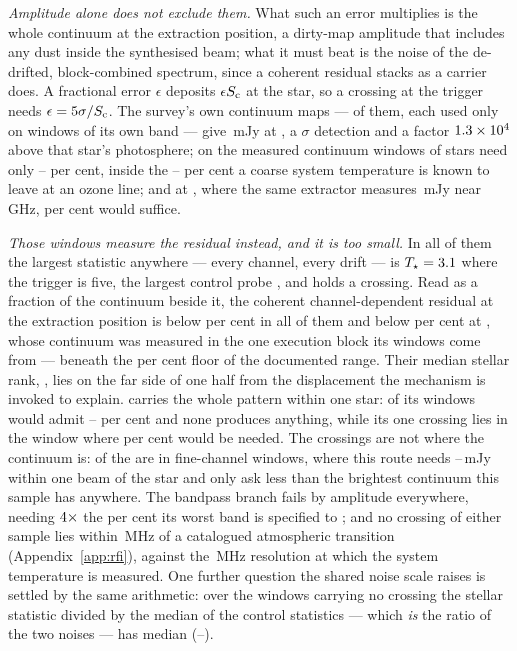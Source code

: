 \emph{Amplitude alone does not exclude them.} What such an error multiplies
is the whole continuum at the extraction position, a dirty-map amplitude that
includes any dust inside the synthesised beam; what it must beat is the noise
of the de-drifted, block-combined spectrum, since a coherent residual stacks
as a carrier does. A fractional error $\epsilon$ deposits $\epsilon S_{\rm c}$
at the star, so a crossing at the trigger needs $\epsilon=5\sigma/S_{\rm c}$.
The survey's own continuum maps --- \CxNMap{} of them, each used only on
windows of its own band --- give \CxContMax\,mJy at \CxContMaxStar, a
\CxContMaxSnr$\sigma$ detection and a factor $1.3\times10^{4}$ above that star's
photosphere; on the measured continuum \CxNAdmit{} windows of
\CxNAdmitStar{} stars need only \CxEpsAdmitLoPct--\CxEpsAdmitHiPct{} per
cent, inside the \CdSpecTsysLo--\CdSpecTsysHi{} per cent a coarse system
temperature is known to leave at an ozone line; and at \CxAuStar, where the
same extractor measures \CxAuContMJy\,mJy near \CxAuGHz\,GHz,
\CxAuEpsPct{} per cent would suffice.

\emph{Those windows measure the residual instead, and it is too small.} In
all \CxNAdmit{} of them the largest statistic anywhere --- every channel,
every drift --- is $T_\star=3.1$ where the trigger is five, the
largest control probe \CxAdmitCtrlHi, and \CxAdmitNCrossWord{} holds a
crossing. Read as
a fraction of the continuum beside it, the coherent channel-dependent
residual at the extraction position is below \CxResidHiPct{} per cent in all
of them and below \CxResidBestPct{} per cent at \CxResidBestStar, whose
continuum was measured in the one execution block its windows come from ---
beneath the \CdSpecTsysLo{} per cent floor of the documented range. Their
median stellar rank, \CxAdmitRankMed, lies on the far side of one half from
the displacement the mechanism is invoked to explain. \CxOneStar{} carries
the whole pattern within one star: \CxOneStarNAdmit{} of its windows would
admit \CxOneStarEpsLoPct--\CxOneStarEpsHiPct{} per cent and none produces
anything, while its one crossing lies in the window where
\CxOneStarCrossEpsPct{} per cent would be needed. The crossings are not
where the continuum is: \CxNCrossFine{} of the \CxNCrossWin{} are in
fine-channel windows, where this route needs
\CxCrossNeedLo--\CxCrossNeedHi\,mJy within one beam of the star and only
\CxCrossNeedNBelow{} ask less than the brightest continuum this sample has
anywhere. The bandpass branch fails by amplitude everywhere, needing
$4\times$ the \CdSpecBpWorst{} per cent its worst band is specified
to \citep{ALMATechNote15}; and no crossing of either sample lies within
\TlOffMin\,MHz of a catalogued atmospheric transition
(Appendix~\ref{app:rfi}), against the \CdSpecTsysRes\,MHz resolution at which
the system temperature is measured. One further question the shared noise
scale raises is settled by the same arithmetic: over the \NsrNWin{} windows
carrying no crossing the stellar statistic divided by the median of the
\NCtrl{} control statistics --- which \emph{is} the ratio of the two noises
--- has median \NsrMed{} (\NsrLo--\NsrHi).

